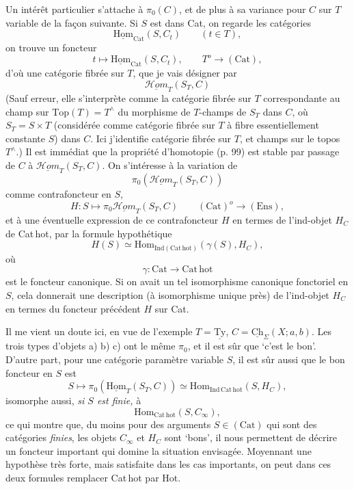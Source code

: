 \documentclass[11pt]{article}
\newcommand{\printedpage}[1]{\marginpar{\footnotesize p.~#1}}
\newcommand{\msp}[1]{\marginpar{\vspace*{10pt}\footnotesize [#1]}}
\newcommand{\uTy}{\underline{\mathrm{Ty}}}
\newcommand{\Hom}{\mathrm{Hom}}
\newcommand{\uHom}{\underline{\mathrm{Hom}}}
\newcommand{\uCh}{\underline{\mathrm{Ch}}}
\newcommand{\Cat}{\mathrm{Cat}}
\newcommand{\Cathot}{\mathrm{Cat\,hot}}
\newcommand{\sHom}{\underline{\mathcal{H}\mathit{om}}}
\begin{document}
Un intérêt particulier s'attache à $\pi_{0}(C)$, et de plus à sa variance pour $C$ sur $T$ variable de la façon suivante. Si $S$ est dans Cat, on regarde les catégories
\[
\uHom_{\Cat}(S,C_{t}) \qquad (t \in T),
\]
on trouve un foncteur
\[
t \longmapsto \uHom_{\Cat}(S,C_{t}), \qquad T^{o} \longrightarrow (\Cat),
\]
d'où une catégorie fibrée sur $T$, que je vais désigner par
\[
\sHom_{T}(S_{T},C)
\]
(Sauf erreur, elle s'interprète comme la catégorie fibrée sur $T$ correspondante au champ sur $\mathrm{Top}(T) = T^{\wedge}$ du morphisme de $T$-champs de $S_{T}$ dans $C$, où $S_{T} = S \times T$ (considérée comme catégorie fibrée sur $T$ à fibre essentiellement constante $S$) dans $C$. Ici j'identifie catégorie fibrée sur $T$, et champs sur le topos $T^{\wedge}$.) Il est immédiat que la propriété d'homotopie (p. 99) est stable par passage de $C$ à $\sHom_{T}(S_{T},C)$. On s'intéresse à la variation de
\[
\pi_{0}(\sHom_{T}(S_{T},C))
\]
\printedpage{68}
\msp{page 106}
comme contrafoncteur en $S$,
\[
H : S \longmapsto \pi_{0}\sHom_{T}(S_{T},C) \qquad (\Cat)^{o} \longrightarrow (\mathrm{Ens}),
\]
et à une éventuelle expression de ce contrafoncteur $H$ en termes de l'ind-objet $H_{C}$ de Cat\,hot, par la formule hypothétique
\[
H(S) \simeq \Hom_{\mathrm{Ind}(\Cathot)}(\gamma(S),H_{C}),
\]
où
\[
\gamma : \Cat \longrightarrow \Cathot
\]
est le foncteur canonique. Si on avait un tel isomorphisme canonique fonctoriel en $S$, cela donnerait une description (à isomorphisme unique près) de l'ind-objet $H_{C}$ en termes du foncteur précédent $H$ sur Cat.

Il me vient un doute ici, en vue de l'exemple $T = \uTy$, $C = \uCh_{\Sigma}(X;a,b)$. Les trois types d'objets a) b) c) ont le même $\pi_{0}$, et il est sûr que ‘c'est le bon'. D'autre part, pour une catégorie paramètre variable $S$, il est sûr aussi que le bon foncteur en $S$ est
\[
S \longmapsto \pi_{0}(\uHom_{T}(S_{T},C)) \simeq \Hom_{\mathrm{Ind}\,\Cathot}(S,H_{C}),
\]
isomorphe aussi, \textit{si $S$ est finie,} à
\[
\Hom_{\Cathot}(S,C_{\infty}),
\]
ce qui montre que, du moins pour des arguments $S \in (\Cat)$ qui sont des catégories \textit{finies}, les objets
\msp{page 107}
$C_{\infty}$ et $H_{C}$ sont ‘bons', il nous permettent %
de décrire un foncteur important qui domine la situation envisagée. Moyennant une hypothèse très forte, mais satisfaite dans les cas importants, on peut dans ces deux formules remplacer Cat\,hot par Hot.
\end{document}
